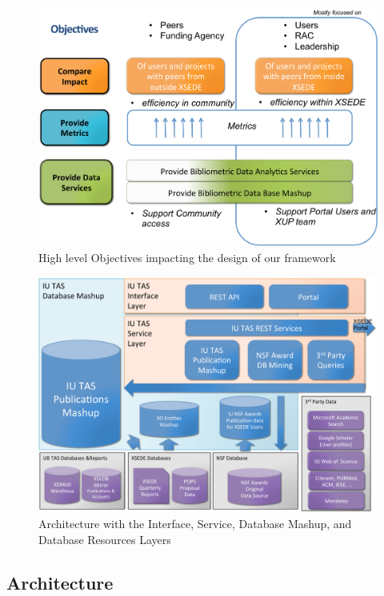 \documentclass{sig-alternate}
\begin{document}
\begin{figure}[htb] 
  \centering 
    \includegraphics[width=1.0\columnwidth]{images-new/objectives.pdf} 
    \caption{High level Objectives impacting the design of our framework}
    \label{F:objectives}
\end{figure} 

\begin{figure}[htb] 
  \centering 
    \includegraphics[width=1.0\columnwidth]{images-new/architecture.pdf} 
  \caption{Architecture with the Interface, Service, Database Mashup,
    and Database Resources Layers}\label{F:architecture} 
\end{figure} 



\subsection{Architecture}
\end{document}
